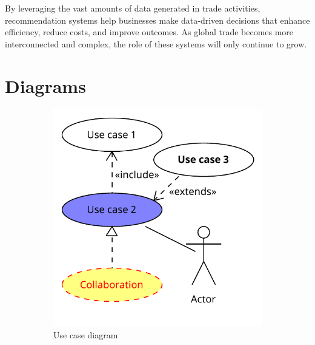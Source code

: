 \documentclass[10pt,twoside,slovak,a4paper]{article}
\begin{document}
\noindent By leveraging the vast amounts of data generated in trade activities, recommendation systems help businesses make data-driven decisions that enhance efficiency, reduce costs, and improve outcomes. As global trade becomes more interconnected and complex, the role of these systems will only continue to grow.




\section{Diagrams} \label{dolezitejsia}

\begin{figure}[htbp]
    \centering
    \begin{subfigure}[b]{0.45\textwidth}
        \centering
        \includegraphics[width=\textwidth]{Diagrams/Diagram.pdf}
        \caption{Use case diagram}
        \label{fig:collaborative_filtering}
    \end{subfigure}
    \hfill
    \begin{subfigure}[b]{0.45\textwidth}
        \centering

\end{subfigure}
\end{figure}
\end{document}
